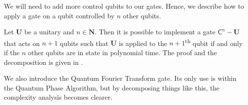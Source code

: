 \documentclass[11pt, a4paper]{article}
\begin{document}
                We will need to add more control qubits to our gates. Hence, we describe how to apply a gate on a qubit controlled by \(n\) other qubits.
                
                \begin{definition}
                    Let \(\mathbf{U}\) be a unitary and \(n\in\mathbf{N}\). Then it is possible to implement a gate \(\mathsf{C}^n-\mathbf{U}\) that acts on \(n+1\) qubits such that \(\mathbf{U}\) is applied to the \(n+1\)\textsuperscript{th} qubit if and only if the \(n\) other qubits are in state  in polynomial time. The proof and the decomposition is given in \cite{Braida}.
                \end{definition}
                
                We also introduce the Quantum Fourier Transform gate. Its only use is within the Quantum Phase Algorithm, but by decomposing things like this, the complexity analysis becomes clearer.
\end{document}

